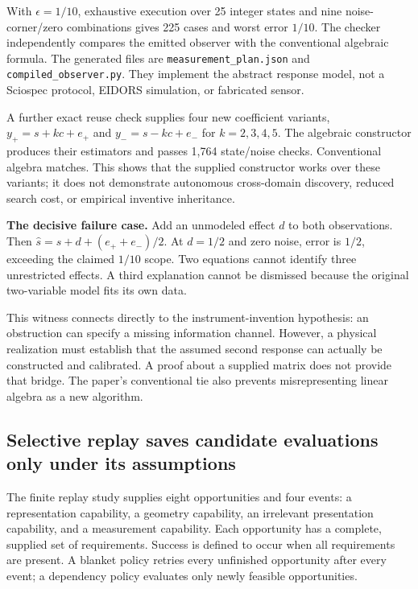 \documentclass[11pt,letterpaper]{article}
\theoremstyle{remark}\newtheorem{remark}{Remark}[section]
\begin{document}
With $\epsilon=1/10$, exhaustive execution over 25 integer states and nine noise-corner/zero combinations gives 225 cases and worst error $1/10$. The checker independently compares the emitted observer with the conventional algebraic formula. The generated files are \texttt{measurement\_plan.json} and \texttt{compiled\_observer.py}. They implement the abstract response model, not a Sciospec protocol, EIDORS simulation, or fabricated sensor.

A further exact reuse check supplies four new coefficient variants, $y_+=s+kc+e_+$ and $y_-=s-kc+e_-$ for $k=2,3,4,5$. The algebraic constructor produces their estimators and passes 1,764 state/noise checks. Conventional algebra matches. This shows that the supplied constructor works over these variants; it does not demonstrate autonomous cross-domain discovery, reduced search cost, or empirical inventive inheritance.

\begin{statusbox}
\textbf{The decisive failure case.} Add an unmodeled effect $d$ to both observations. Then $\widehat{s}=s+d+(e_++e_-)/2$. At $d=1/2$ and zero noise, error is $1/2$, exceeding the claimed $1/10$ scope. Two equations cannot identify three unrestricted effects. A third explanation cannot be dismissed because the original two-variable model fits its own data.
\end{statusbox}

This witness connects directly to the instrument-invention hypothesis: an obstruction can specify a missing information channel. However, a physical realization must establish that the assumed second response can actually be constructed and calibrated. A proof about a supplied matrix does not provide that bridge. The paper's conventional tie also prevents misrepresenting linear algebra as a new algorithm.

\subsection{Selective replay saves candidate evaluations only under its assumptions}
The finite replay study supplies eight opportunities and four events: a representation capability, a geometry capability, an irrelevant presentation capability, and a measurement capability. Each opportunity has a complete, supplied set of requirements. Success is defined to occur when all requirements are present. A blanket policy retries every unfinished opportunity after every event; a dependency policy evaluates only newly feasible opportunities.
\end{document}
